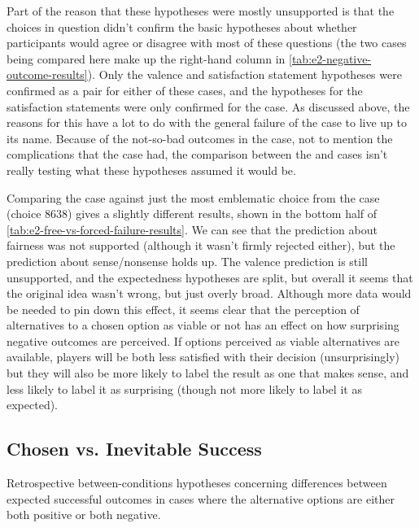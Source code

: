 Part of the reason that these hypotheses were mostly unsupported is that the choices in question didn't confirm the basic hypotheses about whether participants would agree or disagree with most of these questions (the two cases being compared here make up the right-hand column in \cref{tab:e2-negative-outcome-results}).
%
Only the valence and satisfaction statement hypotheses were confirmed as a pair for either of these cases, and the hypotheses for the satisfaction statements were only confirmed for the \unxf{} case.
%
As discussed above, the reasons for this have a lot to do with the general failure of the \obvfm{} case to live up to its name.
%
Because of the not-so-bad outcomes in the \obvfm{} case, not to mention the complications that the \unxf{} case had, the comparison between the \unxf{} and \obvfm{} cases isn't really testing what these hypotheses assumed it would be.


Comparing the \unxf{} case against just the most emblematic choice from the \obvfm{} case (choice 8638) gives a slightly different results, shown in the bottom half of \cref{tab:e2-free-vs-forced-failure-results}.
%
We can see that the prediction about fairness was not supported (although it wasn't firmly rejected either), but the prediction about sense/nonsense holds up.
%
The valence prediction is still unsupported, and the expectedness hypotheses are split, but overall it seems that the original idea wasn't wrong, but just overly broad.
%
Although more data would be needed to pin down this effect, it seems clear that the perception of alternatives to a chosen option as viable or not has an effect on how surprising negative outcomes are perceived.
%
If options perceived as viable alternatives are available, players will be both less satisfied with their decision (unsurprisingly) but they will also be more likely to label the result as one that makes sense, and less likely to label it as surprising (though not more likely to label it as expected).


\subsection{Chosen vs\@. Inevitable Success}

\begin{table}[!p]
\centering
\bgroup
\def\arraystretch{1.3}
\setlength{\tabcolsep}{0.6em}

\egroup
\caption[Retrospective chosen vs\@. inevitable success results]{Retrospective between-conditions hypotheses concerning differences between expected successful outcomes in cases where the alternative options are either both positive or both negative.}
  \label{tab:e2-chosen-vs-inevitable-success-results}
\end{table}

